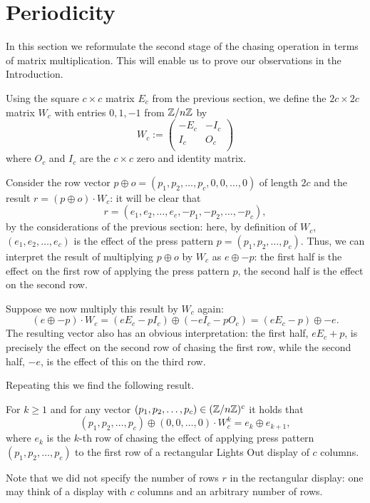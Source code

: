 \section{Periodicity}\label{sec:algebra}
In this section we reformulate the second stage of
the chasing operation in terms of matrix multiplication.
This will enable us to prove our observations in the Introduction.

Using the square $c\times c$ matrix $E_c$ from the previous
section, we define the $2c\times 2c$ matrix $W_{c}$ with entries
$0, 1, -1$ from $\mathbb{Z}/n\mathbb{Z}$ by
\[
W_{c} := \left(
\begin{matrix}
  -E_{c} & -I_{c} \\
  I_{c} & O_{c} \\
\end{matrix}
\right)
\]
where $O_c$ and $I_c$ are the $c\times c$ zero and
identity matrix.

Consider the row vector $p\oplus o=(p_1, p_2, \ldots, p_c, 0, 0, \ldots, 0)$
of length $2c$ and the result $r=(p\oplus o)\cdot W_c$: it will be clear that
$$r=(e_1, e_2, \ldots, e_c, -p_1, -p_2, \ldots, -p_c),$$
by the considerations of the previous section:
here, by definition of $W_c$,
$(e_1, e_2, \ldots, e_c)$ is the effect of
the press pattern $p=(p_1, p_2, \ldots, p_c)$. Thus, we can
interpret the result of multiplying $p\oplus o$ by $W_c$
as $e\oplus -p$: the first half is the effect on the first
row of applying the press pattern $p$, the second half is the
effect on the second row.

Suppose we now multiply this result by $W_c$ again:
$$(e\oplus -p)\cdot W_c=(eE_c-pI_c)\oplus (-eI_c-pO_c)=(eE_c-p)\oplus -e.$$
The resulting vector also has an obvious interpretation:
the first half, $eE_c+p$, is precisely the effect on
the second row of chasing the first row, while the
second half, $-e$, is the effect of this on the third row.

Repeating this we find the following result.

\begin{lemma}
For $k\geq 1$ and for any vector
$(p_1, p_2, \ldots, p_c)\in (\mathbb{Z}/n\mathbb{Z})^c$ it holds that
$$(p_1, p_2, \ldots, p_c)\oplus (0, 0, \ldots,0)\cdot W_c^k=e_k\oplus e_{k+1},$$
where $e_k$ is the $k$-th row of chasing the effect of applying
press pattern $(p_1, p_2, \ldots, p_c)$ to the first row of a
rectangular Lights Out display of $c$ columns.
\end{lemma}
Note that we did not specify the number of rows $r$ in the rectangular
display: %
one may think of a display with $c$ columns and an arbitrary number
of rows.

